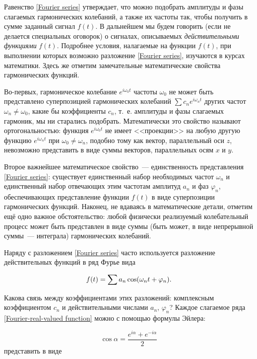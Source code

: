 Равенство \eqref{Fourier series} утверждает, что можно подобрать амплитуды и фазы слагаемых гармонических колебаний, а также их частоты
так, чтобы получить в сумме заданный сигнал $f(t)$. В дальнейшем мы будем говорить (если не делается специальных
оговорок) о сигналах, описываемых \emph{действительными функциями} $f(t)$. Подробнее условия, налагаемые на функции
$f(t)$, при выполнении которых возможно разложение \eqref{Fourier series}, изучаются в курсах математики. Здесь же отметим
замечательные математические свойства гармонических функций.

Во-первых, гармоническое колебание $e^{i\omega_0 t}$ частоты $\omega_0$ не может быть представлено суперпозицией
гармонических колебаний $\sum c_n e^{i\omega_n t}$ других частот $\omega_n\ne\omega_0$, какие бы коэффициенты $c_n$,
т.~е. амплитуды и фазы слагаемых гармоник, мы ни старались подобрать. Математически это свойство называют
ортогональностью: функция $e^{i\omega_0 t}$ не имеет <<проекции>> на любую другую функцию $e^{i\omega_nt}$ при
$\omega_0\ne\omega_n$, подобно тому как вектор, параллельный оси $z$, невозможно представить в виде суммы векторов,
параллельных осям $x$ и $y$.

Второе важнейшее математическое свойство~--- единственность представления \eqref{Fourier series}: существует единственный набор
необходимых частот $\omega_n$ и единственный набор отвечающих этим частотам амплитуд $a_n$ и фаз $\varphi_n$, обеспечивающих
представление функции $f(t)$ в виде суперпозиции гармонических функций. Наконец, не вдаваясь в математические детали,
отметим ещё одно важное обстоятельство: любой физически реализуемый колебательный процесс может быть представлен в виде
суммы (быть может, в виде непрерывной суммы~--- интеграла) гармонических колебаний.

Наряду с разложением \eqref{Fourier series} часто используется разложение действительных функций в ряд Фурье вида

\begin{equation}
	\eqmark{Fourier-real-valued function}
	f(t)=\sum a_n \cos(\omega_n t+\varphi_n ).
\end{equation}

Какова связь между коэффициентами этих разложений: комплексным коэффициентом $c_n$ и действительными числами $a_n$,
$\varphi_n$? Каждое слагаемое ряда \eqref{Fourier-real-valued function} можно с помощью формулы Эйлера:

\begin{equation*}
	\cos\alpha=\frac{e^{i\alpha}+e^{-i\alpha}}{2}
\end{equation*}
представить в виде

